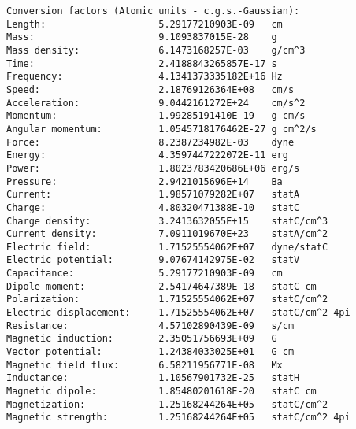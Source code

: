 \documentclass[12pt,a4paper,twoside]{report}
\begin{document}
{\begin{tcolorbox}
\begin{verbatim}
Conversion factors (Atomic units - c.g.s.-Gaussian):
Length:                    5.29177210903E-09   cm
Mass:                      9.1093837015E-28    g
Mass density:              6.1473168257E-03    g/cm^3
Time:                      2.4188843265857E-17 s
Frequency:                 4.1341373335182E+16 Hz
Speed:                     2.18769126364E+08   cm/s
Acceleration:              9.0442161272E+24    cm/s^2
Momentum:                  1.99285191410E-19   g cm/s
Angular momentum:          1.0545718176462E-27 g cm^2/s
Force:                     8.2387234982E-03    dyne
Energy:                    4.3597447222072E-11 erg
Power:                     1.8023783420686E+06 erg/s
Pressure:                  2.9421015696E+14    Ba
Current:                   1.98571079282E+07   statA
Charge:                    4.80320471388E-10   statC
Charge density:            3.2413632055E+15    statC/cm^3
Current density:           7.0911019670E+23    statA/cm^2
Electric field:            1.71525554062E+07   dyne/statC
Electric potential:        9.07674142975E-02   statV
Capacitance:               5.29177210903E-09   cm
Dipole moment:             2.54174647389E-18   statC cm
Polarization:              1.71525554062E+07   statC/cm^2
Electric displacement:     1.71525554062E+07   statC/cm^2 4pi
Resistance:                4.57102890439E-09   s/cm
Magnetic induction:        2.35051756693E+09   G
Vector potential:          1.24384033025E+01   G cm
Magnetic field flux:       6.58211956771E-08   Mx
Inductance:                1.10567901732E-25   statH
Magnetic dipole:           1.85480201618E-20   statC cm
Magnetization:             1.25168244264E+05   statC/cm^2
Magnetic strength:         1.25168244264E+05   statC/cm^2 4pi 


\end{verbatim}
\end{tcolorbox}}
\end{document}
